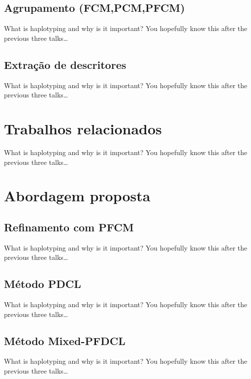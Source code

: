 \documentclass[brazil]{beamer}
\begin{document}
\subsection{Agrupamento (FCM,PCM,PFCM)}
\begin{frame}{What is haplotyping and why is it important?}
  You hopefully know this after the previous three talks\dots
\end{frame}
\subsection{Extração de descritores}
\begin{frame}{What is haplotyping and why is it important?}
  You hopefully know this after the previous three talks\dots
\end{frame}

\section{Trabalhos relacionados}

\begin{frame}{What is haplotyping and why is it important?}
  You hopefully know this after the previous three talks\dots
\end{frame}

\section{Abordagem proposta}

\subsection{Refinamento com PFCM}
\begin{frame}{What is haplotyping and why is it important?}
  You hopefully know this after the previous three talks\dots
\end{frame}
\subsection{Método PDCL}
\begin{frame}{What is haplotyping and why is it important?}
  You hopefully know this after the previous three talks\dots
\end{frame}
\subsection{Método Mixed-PFDCL}
\begin{frame}{What is haplotyping and why is it important?}
  You hopefully know this after the previous three talks\dots
\end{frame}
\end{document}
